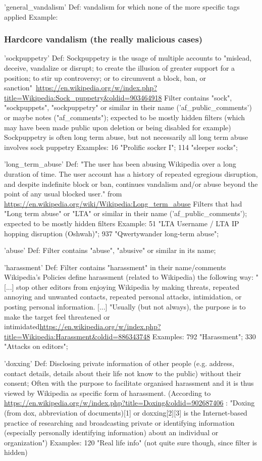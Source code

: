 'general\_vandalism'
 Def: vandalism for which none of the more specific tags applied
 Example:

\subsubsection{Hardcore vandalism (the really malicious cases)}
'sockpuppetry'
  Def: Sockpuppetry is the usage of multiple accounts to "mislead, deceive, vandalize or disrupt; to create the illusion of greater support for a position; to stir up controversy; or to circumvent a block, ban, or sanction"~\url{https://en.wikipedia.org/w/index.php?title=Wikipedia:Sock_puppetry&oldid=903464918}
  Filter contains "sock", "sockpuppets", "sockpuppetry" or similar in their name ('af\_public\_comments') or maybe notes ("af\_comments"); expected to be mostly hidden filters (which may have been made public upon deletion or being disabled for example)
  Sockpuppetry is often long term abuse, but not necessarily all long term abuse involves sock puppetry
  Examples: 16 "Prolific socker I"; 114 "sleeper socks";

'long\_term\_abuse'
  Def:
  "The user has been abusing Wikipedia over a long duration of time. The user account has a history of repeated egregious disruption, and despite indefinite block or ban, continues vandalism and/or abuse beyond the point of any usual blocked user." from \url{https://en.wikipedia.org/wiki/Wikipedia:Long_term_abuse}
  Filters that had "Long term abuse" or "LTA" or similar in their name ('af\_public\_comments'); expected to be mostly hidden filters
  Example: 51 "LTA Username / LTA IP hopping disruption (Oshwah)"; 937 "Qwertywander long-term abuse";

'abuse'
  Def: Filter contains "abuse", "abusive" or similar in its name; %

'harassment'
  Def: Filter contains "harassment" in their name/comments
  Wikipedia's Policies define harassment (related to Wikipedia) the following way: "[...] stop other editors from enjoying Wikipedia by making threats, repeated annoying and unwanted contacts, repeated personal attacks, intimidation, or posting personal information. [...] "Usually (but not always), the purpose is to make the target feel threatened or intimidated\url{https://en.wikipedia.org/w/index.php?title=Wikipedia:Harassment&oldid=886343748}
  Examples: 792 "Harassment"; 330 "Attacks on editors";

'doxxing'
  Def: Disclosing private information of other people (e.g. address, contact details, details about their life not know to the public) without their consent; Often with the purpose to facilitate organised harassment and it is thus viewed by Wikipedia as specific form of harassment.
  (According to \url{https://en.wikipedia.org/w/index.php?title=Doxing&oldid=902687406} : "Doxing (from dox, abbreviation of documents)[1] or doxxing[2][3] is the Internet-based practice of researching and broadcasting private or identifying information (especially personally identifying information) about an individual or organization")
  Examples: 120 "Real life info" (not quite sure though, since filter is hidden)

